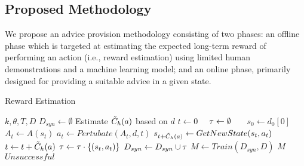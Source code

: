 \subsection{Proposed Methodology}

We propose an advice provision methodology consisting of two phases: an offline phase which is targeted at estimating the expected long-term reward of performing an action (i.e., reward estimation) using limited human demonstrations and a machine learning model; and an online phase, primarily designed for providing a suitable advice in a given state.   



\begin{algorithm}[hbpt!]
\caption{Reward Estimation}\label{alg:generation}
\begin{algorithmic}[1]
\REQUIRE $k,\theta,T,D$
\STATE $D_{syn} \gets \emptyset$
        \STATE Estimate $\Tilde{C}_h(a)$ based on $d$
        \STATE $t\gets 0$ \ \  $\tau \gets \emptyset$
        \ \ \ $s_0 \gets d_0[0]$ \label{S0}
            \STATE $A_t \gets A(s_t)$ 
            \STATE $a_t \gets Pertubate(A_t,d,t)$ \label{Pertubate}
             \STATE $s_{t+\Tilde{C}_h(a)} \gets GetNewState(s_t,a_t)$ \label{GetNewState}
             \STATE $t\gets t+\Tilde{C}_h(a)$
             \STATE $\tau \gets \tau \cdot \{(s_t,a_t)\}$
        \ENDWHILE
        \STATE $D_{syn}\gets D_{syn}\cup\tau$
\ENDFOR
        \ENDFOR
         \label{QualityAssurance}
            \STATE $M\gets Train(D_{syn},D)$
            \RETURN $M$
        \ELSE
            \RETURN $Unsuccessful$
        \ENDIF


\end{algorithmic}
\end{algorithm}


